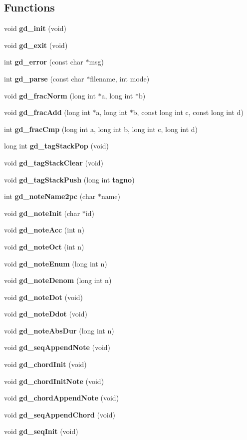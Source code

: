 \subsection*{Functions}
\begin{CompactItemize}
\item 
void {\bf gd\_\-init} (void)
\item 
void {\bf gd\_\-exit} (void)
\item 
int {\bf gd\_\-error} (const char $\ast$msg)
\item 
int {\bf gd\_\-parse} (const char $\ast$filename, int mode)
\item 
void {\bf gd\_\-frac\-Norm} (long int $\ast$a, long int $\ast$b)
\item 
void {\bf gd\_\-frac\-Add} (long int $\ast$a, long int $\ast$b, const long int c, const long int d)
\item 
int {\bf gd\_\-frac\-Cmp} (long int a, long int b, long int c, long int d)
\item 
long int {\bf gd\_\-tag\-Stack\-Pop} (void)
\item 
void {\bf gd\_\-tag\-Stack\-Clear} (void)
\item 
void {\bf gd\_\-tag\-Stack\-Push} (long int {\bf tagno})
\item 
int {\bf gd\_\-note\-Name2pc} (char $\ast$name)
\item 
void {\bf gd\_\-note\-Init} (char $\ast$id)
\item 
void {\bf gd\_\-note\-Acc} (int n)
\item 
void {\bf gd\_\-note\-Oct} (int n)
\item 
void {\bf gd\_\-note\-Enum} (long int n)
\item 
void {\bf gd\_\-note\-Denom} (long int n)
\item 
void {\bf gd\_\-note\-Dot} (void)
\item 
void {\bf gd\_\-note\-Ddot} (void)
\item 
void {\bf gd\_\-note\-Abs\-Dur} (long int n)
\item 
void {\bf gd\_\-seq\-Append\-Note} (void)
\item 
void {\bf gd\_\-chord\-Init} (void)
\item 
void {\bf gd\_\-chord\-Init\-Note} (void)
\item 
void {\bf gd\_\-chord\-Append\-Note} (void)
\item 
void {\bf gd\_\-seq\-Append\-Chord} (void)
\item 
void {\bf gd\_\-seq\-Init} (void)
\item 

\end{CompactItemize}
